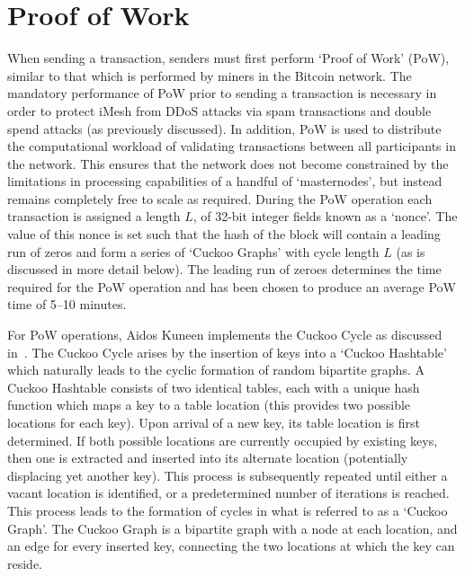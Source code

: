 \documentclass[a4paper,10pt,twocolumn]{article}
\begin{document}
	\section{Proof of Work}
	\label{sec:PoW}
	
	When sending a transaction, senders must first perform `Proof of Work' (PoW), similar to that which is performed by miners in the 
	Bitcoin network. The mandatory performance of PoW prior to sending a transaction is necessary in order to protect iMesh from DDoS 
	attacks via spam transactions and double spend attacks (as previously discussed). In addition, PoW is used to distribute the 
	computational workload of validating transactions between all participants in the network. This ensures that the network does not 
	become constrained by the limitations in processing capabilities of a handful of `masternodes', but instead remains completely free to 
	scale as required. During the PoW operation each transaction is assigned a length \(L\), of 32-bit integer fields known as a `nonce'. 
	The value of this nonce is set such that the hash of the block will contain a leading run of zeros and form a series of `Cuckoo Graphs' with cycle length \(L\) (as is discussed in more detail below). The leading run of zeroes determines the time required for the PoW operation and has been chosen to produce an 
	average PoW time of 5--10 minutes.
	
	\vspace{2.5mm}
	
	For PoW operations, Aidos Kuneen implements the Cuckoo Cycle as discussed in~\cite{cuckoo}. The Cuckoo Cycle arises by the insertion of
	keys into a `Cuckoo Hashtable' which naturally leads to the cyclic formation of random bipartite graphs. A Cuckoo Hashtable consists of 
	two identical tables, each with a unique hash function which maps a key to a table location (this provides two possible locations for 
	each key). Upon arrival of a new key, its table location is first determined. If both possible locations are currently occupied by 
	existing keys, then one is extracted and inserted into its alternate location (potentially displacing yet another key). This process is 
	subsequently repeated until either a vacant location is identified, or a predetermined number of iterations is reached. This process 
	leads to the formation of cycles in what is referred to as a `Cuckoo Graph'. The Cuckoo Graph is a bipartite graph with a node at each 
	location, and an edge for every inserted key, connecting the two locations at which the key can reside.
	
\end{document}
